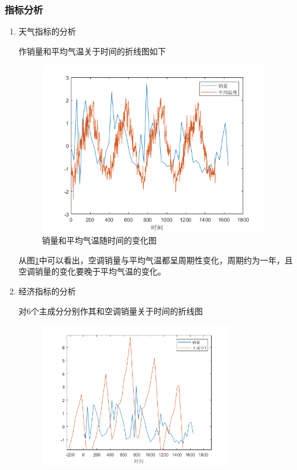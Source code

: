 \documentclass{cumcm}
\begin{document}
\subsubsection{指标分析}
\begin{enumerate}
	\item 天气指标的分析\par
	作销量和平均气温关于时间的折线图如下
	\begin{figure}[H]
		\centering
		\includegraphics[width=0.95\textwidth]{img_backup/temp-sales.png}   
		\caption{销量和平均气温随时间的变化图}  \label{fig:temp_sales}
	\end{figure}
	从图\ref{fig:temp_sales}中可以看出，空调销量与平均气温都呈周期性变化，周期约为一年，且空调销量的变化要晚于平均气温的变化。
	\item 经济指标的分析\par
	对6个主成分分别作其和空调销量关于时间的折线图
	\begin{figure}[H]
		\begin{minipage}[t]{0.5\linewidth}   
		  \centering   
		  \includegraphics[width=0.8\textwidth]{img_backup/pca1-sales.png}   

\end{minipage}
\end{figure}
\end{enumerate}
\end{document}
